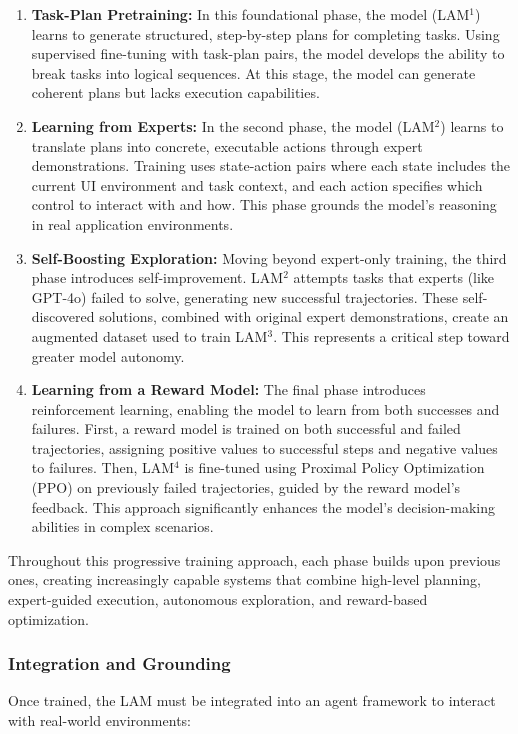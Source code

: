 \documentclass[journal,twoside,10pt]{IEEEtran}
\begin{document}
\begin{enumerate}
    \item \textbf{Task-Plan Pretraining:} In this foundational phase, the model (LAM$^1$) learns to generate structured, step-by-step plans for completing tasks. Using supervised fine-tuning with task-plan pairs, the model develops the ability to break tasks into logical sequences. At this stage, the model can generate coherent plans but lacks execution capabilities.
    
    \item \textbf{Learning from Experts:} In the second phase, the model (LAM$^2$) learns to translate plans into concrete, executable actions through expert demonstrations. Training uses state-action pairs where each state includes the current UI environment and task context, and each action specifies which control to interact with and how. This phase grounds the model's reasoning in real application environments.
    
    \item \textbf{Self-Boosting Exploration:} Moving beyond expert-only training, the third phase introduces self-improvement. LAM$^2$ attempts tasks that experts (like GPT-4o) failed to solve, generating new successful trajectories. These self-discovered solutions, combined with original expert demonstrations, create an augmented dataset used to train LAM$^3$. This represents a critical step toward greater model autonomy.
    
    \item \textbf{Learning from a Reward Model:} The final phase introduces reinforcement learning, enabling the model to learn from both successes and failures. First, a reward model is trained on both successful and failed trajectories, assigning positive values to successful steps and negative values to failures. Then, LAM$^4$ is fine-tuned using Proximal Policy Optimization (PPO) on previously failed trajectories, guided by the reward model's feedback. This approach significantly enhances the model's decision-making abilities in complex scenarios.
\end{enumerate}

Throughout this progressive training approach, each phase builds upon previous ones, creating increasingly capable systems that combine high-level planning, expert-guided execution, autonomous exploration, and reward-based optimization.

\subsubsection{Integration and Grounding}
Once trained, the LAM must be integrated into an agent framework to interact with real-world environments:
\end{document}
